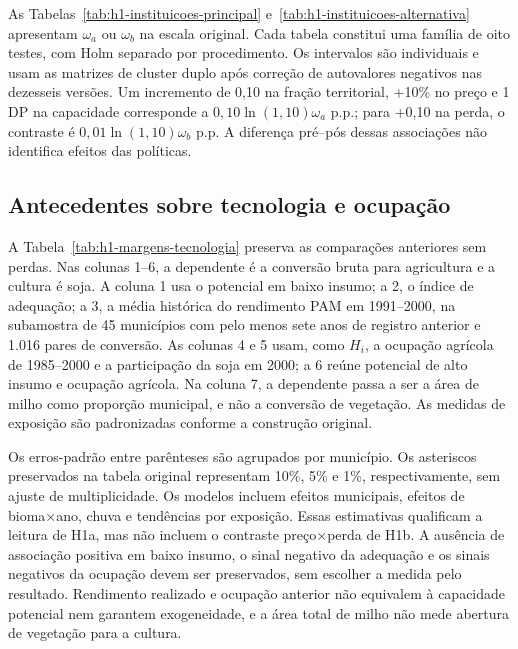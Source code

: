 As Tabelas~\ref{tab:h1-instituicoes-principal} e~\ref{tab:h1-instituicoes-alternativa} apresentam $\omega_a$ ou $\omega_b$ na escala original. Cada tabela constitui uma família de oito testes, com Holm separado por procedimento. Os intervalos são individuais e usam as matrizes de cluster duplo após correção de autovalores negativos nas dezesseis versões. Um incremento de 0,10 na fração territorial, +10\% no preço e 1 DP na capacidade corresponde a $0{,}10\ln(1{,}10)\omega_a$ p.p.; para +0,10 na perda, o contraste é $0{,}01\ln(1{,}10)\omega_b$ p.p. A diferença pré--pós dessas associações não identifica efeitos das políticas.


\FloatBarrier

\FloatBarrier

\subsection{Antecedentes sobre tecnologia e ocupação}
\label{ap:antecedentes}

A Tabela~\ref{tab:h1-margens-tecnologia} preserva as comparações anteriores sem perdas. Nas colunas 1--6, a dependente é a conversão bruta para agricultura e a cultura é soja. A coluna 1 usa o potencial em baixo insumo; a 2, o índice de adequação; a 3, a média histórica do rendimento PAM em 1991--2000, na subamostra de 45 municípios com pelo menos sete anos de registro anterior e 1.016 pares de conversão. As colunas 4 e 5 usam, como $H_i$, a ocupação agrícola de 1985--2000 e a participação da soja em 2000; a 6 reúne potencial de alto insumo e ocupação agrícola. Na coluna 7, a dependente passa a ser a área de milho como proporção municipal, e não a conversão de vegetação. As medidas de exposição são padronizadas conforme a construção original.

Os erros-padrão entre parênteses são agrupados por município. Os asteriscos preservados na tabela original representam 10\%, 5\% e 1\%, respectivamente, sem ajuste de multiplicidade. Os modelos incluem efeitos municipais, efeitos de bioma×ano, chuva e tendências por exposição. Essas estimativas qualificam a leitura de H1a, mas não incluem o contraste preço×perda de H1b. A ausência de associação positiva em baixo insumo, o sinal negativo da adequação e os sinais negativos da ocupação devem ser preservados, sem escolher a medida pelo resultado. Rendimento realizado e ocupação anterior não equivalem à capacidade potencial nem garantem exogeneidade, e a área total de milho não mede abertura de vegetação para a cultura.


\FloatBarrier




